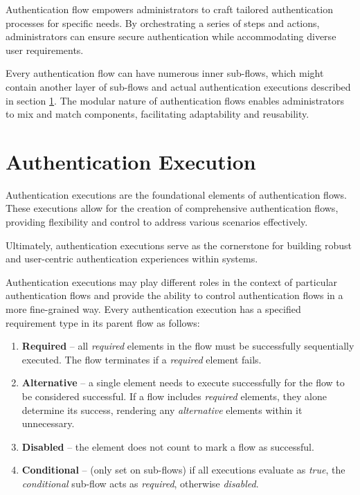 Authentication flow empowers administrators to craft tailored authentication processes for specific needs.
By orchestrating a series of steps and actions, administrators can ensure secure authentication while accommodating diverse user requirements.\cite{keycloak-auth-flows}

Every authentication flow can have numerous inner sub-flows, which might contain another layer of sub-flows and actual authentication executions described in section \ref{keycloak-auth-exec}.
The modular nature of authentication flows enables administrators to mix and match components, facilitating adaptability and reusability.

\section{Authentication Execution}\label{keycloak-auth-exec}
Authentication executions are the foundational elements of authentication flows.
These executions allow for the creation of comprehensive authentication flows, providing flexibility and control to address various scenarios effectively.

Ultimately, authentication executions serve as the cornerstone for building robust and user-centric authentication experiences within systems.

Authentication executions may play different roles in the context of particular authentication flows and provide the ability to control authentication flows in a more fine-grained way. \cite{keycloak-auth-flows}
\newline
\newline
Every authentication execution has a specified requirement type in its parent flow as follows:

\begin{enumerate}
    \item \textbf{Required} -- all \textit{required} elements in the flow must be successfully sequentially executed. The flow terminates if a \textit{required} element fails.
    \item \textbf{Alternative} -- a single element needs to execute successfully for the flow to be considered successful. If a flow includes \textit{required} elements, they alone determine its success, rendering any \textit{alternative} elements within it unnecessary.
    \item \textbf{Disabled} -- the element does not count to mark a flow as successful.
    \item \textbf{Conditional} -- (only set on sub-flows) if all executions evaluate as \textit{true}, the \textit{conditional} sub-flow acts as \textit{required}, otherwise \textit{disabled}.
\end{enumerate}

